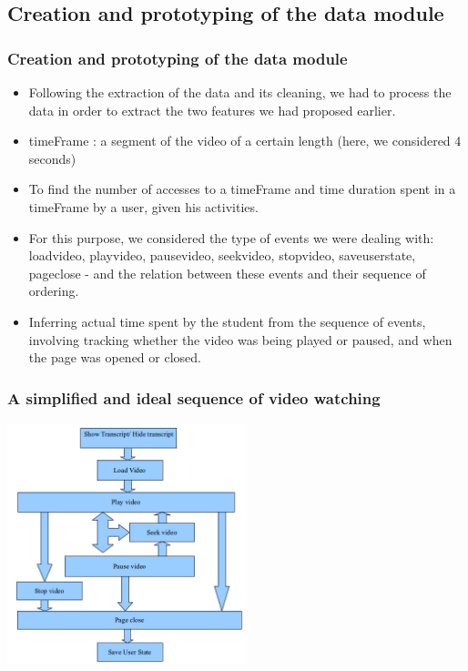 \documentclass[12pt,xcolor=dvipsnames]{beamer}
\begin{document}
\subsection{Creation and prototyping of the data module}
\begin{frame}[t]
\frametitle{Creation and prototyping of the data module}

\begin{itemize}
\item Following the extraction of the data and its cleaning, we had to process the data in order to extract the two features we had proposed earlier.

\item timeFrame : a segment of the video of a certain length (here, we considered 4 seconds)

\item To find the number of accesses to a timeFrame and time duration spent in a timeFrame by a user, given his activities.

\item For this purpose, we considered the type of events we were dealing with: loadvideo, playvideo, pausevideo, seekvideo, stopvideo, saveuserstate, pageclose - and the relation between these events and their sequence of ordering.

\item Inferring actual time spent by the student from the sequence of events, involving tracking whether the video was being played or paused, and when the page was opened or closed.

\end{itemize}

\end{frame}

\begin{frame}[t]
\frametitle{A simplified and ideal sequence of video watching}

\begin{center}
\includegraphics[height=7cm]{Diag3.png}\\ %
\end{center}

\end{frame}
\end{document}
